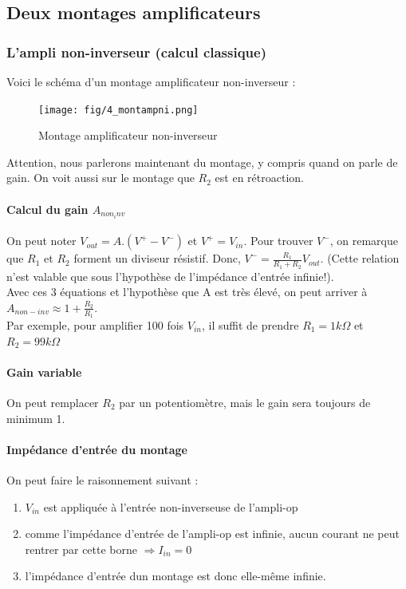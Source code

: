 \documentclass[a4paper]{article}
\begin{document}
    \subsection{Deux montages amplificateurs}
    \subsubsection{L'ampli non-inverseur (calcul classique)}

    Voici le schéma d'un montage amplificateur non-inverseur : 
    \begin{figure}[H]
        \begin{center}
            \texttt{[image: fig/4\_montampni.png]}
            \caption{Montage amplificateur non-inverseur}
            \label{fig:4_montampni}
        \end{center}
    \end{figure}
    Attention, nous parlerons maintenant du montage, y compris quand on parle de gain.
    On voit aussi sur le montage que $R_2$ est en rétroaction.

    \paragraph{Calcul du gain $A_{non_inv}$}
    On peut noter $V_{out} = A.(V^+-V^-)$ et $V^+ = V_{in}$. Pour trouver $V^-$, 
    on remarque que $R_1$ et $R_2$ forment un diviseur résistif. Donc, 
    $V^- = \frac{R_1}{R_1+R_2}V_{out}$. (Cette relation n'est valable que
    sous l'hypothèse de l'impédance d'entrée infinie!).\\

    Avec ces 3 équations et l'hypothèse que A est très élevé, on peut arriver 
    à $A_{non-inv} \approx 1 + \frac{R_2}{R_1}$.\\

    Par exemple, pour amplifier 100 fois $V_{in}$, il suffit de prendre $R_1 = 1k\Omega$
    et $R_2 = 99k\Omega$

    \paragraph{Gain variable}
    On peut remplacer $R_2$ par un potentiomètre, mais le gain sera toujours de
    minimum 1.

    \paragraph{Impédance d'entrée du montage}
    On peut faire le raisonnement suivant :
    \begin{enumerate}
        \item $V_{in}$ est appliquée à l'entrée non-inverseuse de l'ampli-op
        \item comme l'impédance d'entrée de l'ampli-op est infinie, aucun courant
        ne peut rentrer par cette borne $\Rightarrow I_{in} = 0$
        \item l'impédance d'entrée dun montage est donc elle-même infinie.
    \end{enumerate}
\end{document}
